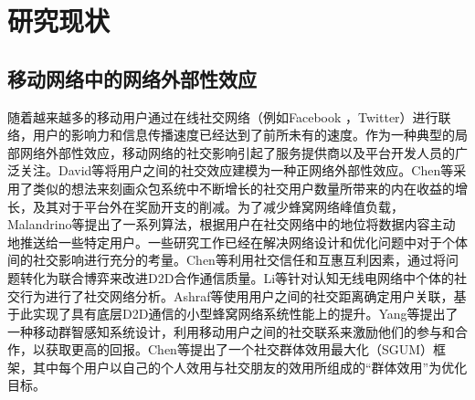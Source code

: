 

\section{研究现状}

\subsection{移动网络中的网络外部性效应}


随着越来越多的移动用户通过在线社交网络（例如Facebook \cite{FB}，Twitter\cite{Twitter}）进行联络，用户的影响力和信息传播速度已经达到了前所未有的速度\cite{Niyato}。作为一种典型的局部网络外部性效应，移动网络的社交影响引起了服务提供商以及平台开发人员的广泛关注。David等\cite{David10}将用户之间的社交效应建模为一种正网络外部性效应。Chen等\cite{Baochun}采用了类似的想法来刻画众包系统中不断增长的社交用户数量所带来的内在收益的增长，及其对于平台外在奖励开支的削减。为了减少蜂窝网络峰值负载，Malandrino等\cite{social}提出了一系列算法，根据用户在社交网络中的地位将数据内容主动地推送给一些特定用户。一些研究工作已经在解决网络设计和优化问题中对于个体间的社交影响进行充分的考量。Chen等\cite{Chen13}利用社交信任和互惠互利因素，通过将问题转化为联合博弈来改进D2D合作通信质量。Li等\cite{li2011propagation}针对认知无线电网络中个体的社交行为进行了社交网络分析。Ashraf等\cite{Ashraf}使用用户之间的社交距离确定用户关联，基于此实现了具有底层D2D通信的小型蜂窝网络系统性能上的提升。Yang等\cite{Guang}提出了一种移动群智感知系统设计，利用移动用户之间的社交联系来激励他们的参与和合作，以获取更高的回报。Chen等\cite{Chen14}提出了一个社交群体效用最大化（SGUM）框架，其中每个用户以自己的个人效用与社交朋友的效用所组成的“群体效用”为优化目标。



